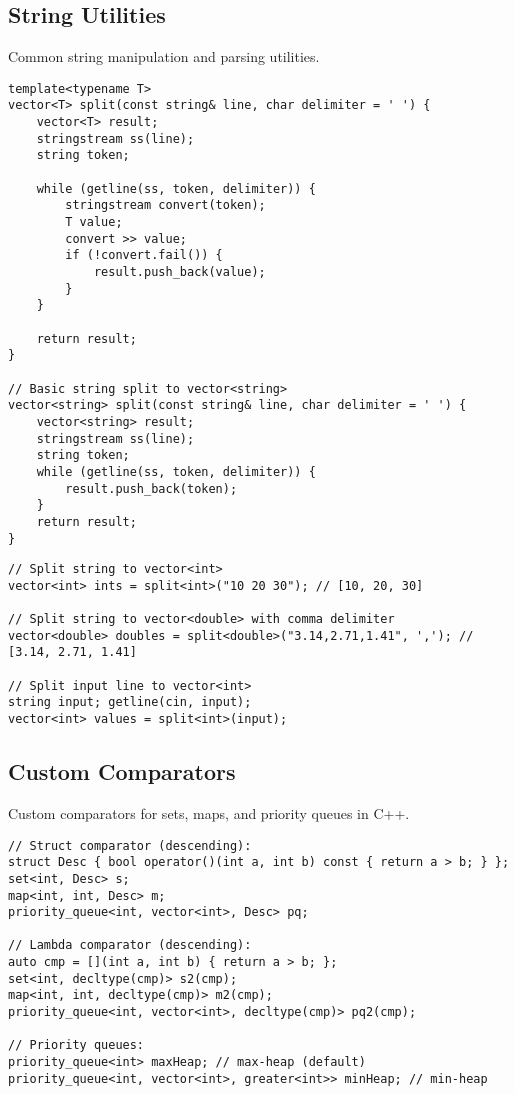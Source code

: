 \documentclass[11pt,a4paper]{article}
\begin{document}
\newpage

\subsection{String Utilities}
Common string manipulation and parsing utilities.

\begin{lstlisting}[caption={String Split Utility}]
template<typename T>
vector<T> split(const string& line, char delimiter = ' ') {
    vector<T> result;
    stringstream ss(line);
    string token;

    while (getline(ss, token, delimiter)) {
        stringstream convert(token);
        T value;
        convert >> value;
        if (!convert.fail()) {
            result.push_back(value);
        }
    }

    return result;
}

// Basic string split to vector<string>
vector<string> split(const string& line, char delimiter = ' ') {
    vector<string> result;
    stringstream ss(line);
    string token;
    while (getline(ss, token, delimiter)) {
        result.push_back(token);
    }
    return result;
}
\end{lstlisting}

\begin{lstlisting}[caption={String Split Examples}]
// Split string to vector<int>
vector<int> ints = split<int>("10 20 30"); // [10, 20, 30]

// Split string to vector<double> with comma delimiter
vector<double> doubles = split<double>("3.14,2.71,1.41", ','); // [3.14, 2.71, 1.41]

// Split input line to vector<int>
string input; getline(cin, input);
vector<int> values = split<int>(input);
\end{lstlisting}



\newpage

\subsection{Custom Comparators}
Custom comparators for sets, maps, and priority queues in C++.

\begin{lstlisting}[caption={Custom Comparator Approaches}]
// Struct comparator (descending):
struct Desc { bool operator()(int a, int b) const { return a > b; } };
set<int, Desc> s; 
map<int, int, Desc> m; 
priority_queue<int, vector<int>, Desc> pq;

// Lambda comparator (descending):
auto cmp = [](int a, int b) { return a > b; };
set<int, decltype(cmp)> s2(cmp);
map<int, int, decltype(cmp)> m2(cmp);
priority_queue<int, vector<int>, decltype(cmp)> pq2(cmp);

// Priority queues:
priority_queue<int> maxHeap; // max-heap (default)
priority_queue<int, vector<int>, greater<int>> minHeap; // min-heap
\end{lstlisting}
\end{document}
